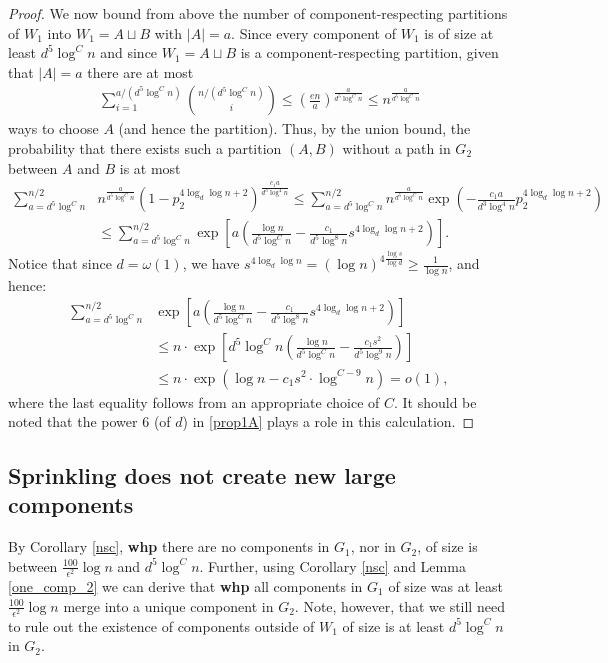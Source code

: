 \documentclass[notitlepage]{scrartcl}
\begin{document}
\begin{proof}
    We now bound from above the number of component-respecting partitions of $W_1$ into $W_1= A \sqcup B$ with $|A| = a$. Since every component of $W_1$ is of size at least $d^5\log^C n$ and since $W_1= A \sqcup B$ is a component-respecting partition, given that $|A| = a$ there are at most 
    \begin{align*}
        \sum_{i=1}^{a/(d^5\log^C n)}\binom{n/(d^5\log^C n)}{i}\le\left(\frac{en}{a}\right)^\frac{a}{d^5\log^C n}\leq n^\frac{a}{d^5\log^C n}
    \end{align*}
    ways to choose $A$ (and hence the partition). Thus, by the union bound, the probability that there exists such a partition $(A,B)$ without a path in $G_2$ between $A$ and $B$ is at most
    \begin{align*}
        \sum_{a=d^5\log^C n}^{n/2}& n^{\frac{a}{d^5\log^C n}}\left(1-p_2^{4\log_d\log n+2}\right)^{\frac{c_1a}{d^3\log^4 n}}\le \sum_{a=d^5\log^C n}^{n/2} n^{\frac{a}{d^5\log^C n}} \exp \left(-\frac{c_1a}{d^3\log^4 n}p_2^{4\log_d\log n+2}\right)\\
        &\le \sum_{a=d^5\log^C n}^{n/2} \exp \left[a\left(\frac{\log n}{d^5\log^C n}-\frac{c_1}{d^5\log^8 n}s^{4\log_d\log n+2}\right)\right].
    \end{align*}
    Notice that since $d=\omega(1)$, we have $s^{4\log_d\log n}=(\log n)^{4\frac{\log s}{\log d}}\ge \frac{1}{\log n}$, and hence:
    \begin{align*}
        \sum_{a=d^5\log^C n}^{n/2}& \exp \left[a\left(\frac{\log n}{d^5\log^C n}-\frac{c_1}{d^5\log^8 n}s^{4\log_d\log n+2}\right)\right]\\
        &\le n\cdot \exp \left[d^5\log^C n\left(\frac{\log n}{d^5\log^C n}-\frac{c_1s^2}{d^5\log^9 n}\right)\right]\\
        &\le n\cdot \exp \left(\log n-c_1s^2\cdot \log^{C-9} n\right)=o(1),
    \end{align*}
    where the last equality follows from an appropriate choice of $C$. It should be noted that the power $6$ (of $d$) in \ref{prop1A} plays a role in this calculation.
\end{proof}

\subsection{Sprinkling does not create new large components}


By Corollary \ref{nsc}, \textbf{whp} there are no components in $G_1$, nor in $G_2$, of size is between $\frac{100}{\epsilon^2}\log n$ and $d^5\log^C n$. Further, using Corollary \ref{nsc} and Lemma \ref{one_comp_2} we can derive that \textbf{whp} all components in $G_1$ of size was at least $\frac{100}{\epsilon^2}\log n$ merge into a unique component in $G_2$. Note, however, that we still need to rule out the existence of components outside of $W_1$ of size is at least $d^5\log^C n$ in $G_2$.
\end{document}
